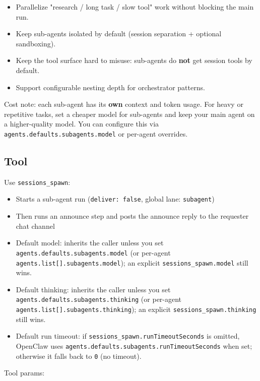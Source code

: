 \begin{itemize}
  \item Parallelize "research / long task / slow tool" work without blocking the main run.
  \item Keep sub-agents isolated by default (session separation + optional sandboxing).
  \item Keep the tool surface hard to misuse: sub-agents do \textbf{not} get session tools by default.
  \item Support configurable nesting depth for orchestrator patterns.
\end{itemize}


Cost note: each sub-agent has its \textbf{own} context and token usage. For heavy or repetitive
tasks, set a cheaper model for sub-agents and keep your main agent on a higher-quality model.
You can configure this via \texttt{agents.defaults.subagents.model} or per-agent overrides.

\subsection{Tool}


Use \texttt{sessions\_spawn}:

\begin{itemize}
  \item Starts a sub-agent run (\texttt{deliver: false}, global lane: \texttt{subagent})
  \item Then runs an announce step and posts the announce reply to the requester chat channel
  \item Default model: inherits the caller unless you set \texttt{agents.defaults.subagents.model} (or per-agent \texttt{agents.list[].subagents.model}); an explicit \texttt{sessions\_spawn.model} still wins.
  \item Default thinking: inherits the caller unless you set \texttt{agents.defaults.subagents.thinking} (or per-agent \texttt{agents.list[].subagents.thinking}); an explicit \texttt{sessions\_spawn.thinking} still wins.
  \item Default run timeout: if \texttt{sessions\_spawn.runTimeoutSeconds} is omitted, OpenClaw uses \texttt{agents.defaults.subagents.runTimeoutSeconds} when set; otherwise it falls back to \texttt{0} (no timeout).
\end{itemize}


Tool params:

